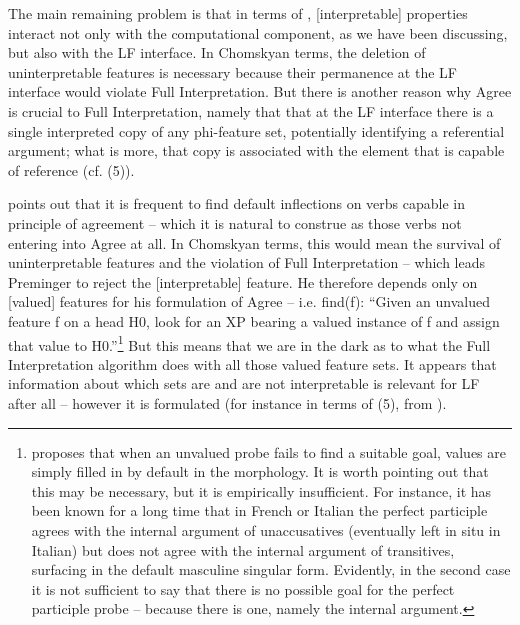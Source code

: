 \documentclass[output=paper]{langsci/langscibook}
\begin{document}
The main remaining problem is that in terms of \citet{Chomsky2000,Chomsky2001Derivation}, [interpretable] properties interact not only with the computational component, as we have been discussing, but also with the LF interface. In Chomskyan terms, the deletion of uninterpretable features is necessary because their permanence at the LF interface would violate Full Interpretation. But there is another reason why Agree is crucial to Full Interpretation, namely that {that at the LF interface there is a single interpreted copy of any phi-feature set, potentially identifying a referential argument; what is more, that copy is associated with the element that is capable of reference (cf. (5)).}

\citet{Preminger2014}{} points out that it is frequent to find default inflections on verbs capable in principle of agreement – which it is natural to construe as those verbs not entering into Agree at all.{} In Chomskyan terms, this would mean the survival of uninterpretable features and the violation of Full Interpretation – which leads Preminger to reject the [interpretable] feature. He therefore {depends only on [valued] features for his formulation of Agree – i.e.} {fi}{nd(f): “Given an unvalued feature f on a head H0, look for an XP bearing a valued instance of f and assign that value to H0.”}\footnote{\citet{Preminger2014} proposes that when an unvalued probe fails to find a suitable goal, values are simply filled in by default in the morphology. It is worth pointing out that this may be necessary, but it is empirically insufficient. For instance, it has been known for a long time \citep{Kayne1989} that in French or Italian the perfect participle agrees with the internal argument of unaccusatives (eventually left in situ in Italian) but does not agree with the internal argument of transitives, surfacing in the default masculine singular form. Evidently, in the second case it is not sufficient to say that there is no possible goal for the perfect participle probe – because there is one, namely the internal argument.} { But this means that we are in the dark as to what the Full Interpretation algorithm does with all those valued feature sets. It appears that information about which sets are and are not interpretable is relevant for LF after all – however it is formulated (for instance in terms of (5), from \citealt{Baker2008}).}
\end{document}
